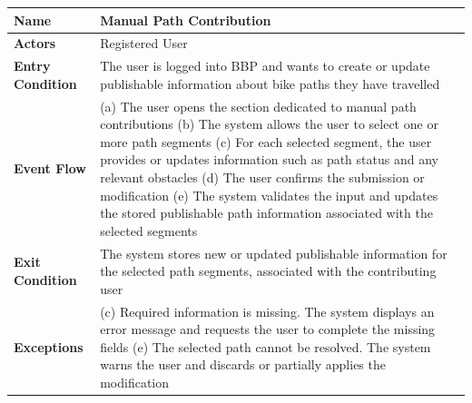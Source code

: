 \begin{table}[H]
\centering
\begin{tabular}{|p{4cm}|p{10cm}|}
\hline
\textbf{Name} & Manual Path Contribution \\ \hline
\textbf{Actors} & Registered User \\ \hline
\textbf{Entry Condition} & The user is logged into BBP and wants to create or update publishable information about bike paths they have travelled \\ \hline
\textbf{Event Flow} &
(a) The user opens the section dedicated to manual path contributions \newline
(b) The system allows the user to select one or more path segments \newline
(c) For each selected segment, the user provides or updates information such as path status and any relevant obstacles \newline
(d) The user confirms the submission or modification \newline
(e) The system validates the input and updates the stored publishable path information associated with the selected segments \\ \hline
\textbf{Exit Condition} & The system stores new or updated publishable information for the selected path segments, associated with the contributing user \\ \hline
\textbf{Exceptions} &
(c) Required information is missing. The system displays an error message and requests the user to complete the missing fields \newline
(e) The selected path cannot be resolved. The system warns the user and discards or partially applies the modification \\ \hline
\end{tabular}
\end{table}

